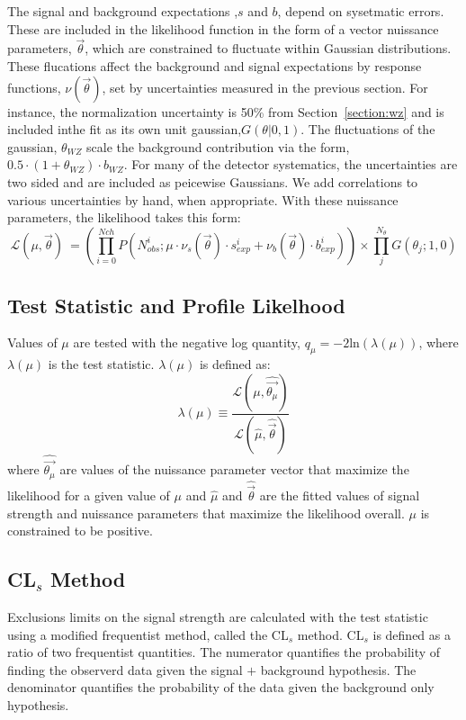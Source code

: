 The signal and background expectations ,$s$ and $b$, depend on sysetmatic errors. These are included in the likelihood function in the form of a vector nuissance parameters, $\vec{\theta}$, which are constrained to fluctuate within Gaussian distributions. These flucations affect the background and signal expectations by response functions, $\nu(\vec{\theta})$, set by uncertainties measured in the previous section. For instance, the \WZ normalization uncertainty is 50\% from Section~\ref{section:wz} and is included inthe fit as its own unit gaussian,$G(\theta|0,1)$. The fluctuations of the gaussian, $\theta_{WZ}$ scale the background contribution via the form, $0.5\cdot(1+\theta_{WZ})\cdot b_{WZ}$. For many of the detector systematics, the uncertainties are two sided and are included as peicewise Gaussians. We add correlations to various uncertainties by hand, when appropriate. With these nuissance parameters, the likelihood takes this form:
\begin{equation}
\mathcal{L}(\mu,\vec{\theta})\ =  \left( \prod_{i=0}^{N{ch}} P(N_{obs}^{i}; \mu \cdot \nu_{s}(\vec{\theta})\cdot s_{exp}^{i} + \nu_{b}(\vec{\theta})\cdot b_{exp}^{i}) \right) \times \prod_{j}^{N_{\theta}}G(\theta_j; 1,0)
\end{equation}


\subsection{Test Statistic and Profile Likelhood}

Values of $\mu$ are tested with the negative log quantity, $q_{\mu}= -2$ln$(\lambda(\mu))$, where $\lambda(\mu)$ is the test statistic.
$\lambda(\mu)$ is defined as:
\begin{equation}
\lambda(\mu) \equiv \frac{\mathcal{L}(\mu,\hat{\vec{\theta_{\mu}}})}{\mathcal{L}(\hat{\mu},\hat{\vec{\theta}})}
\end{equation}
where $\hat{\vec{\theta_{\mu}}}$ are values of the nuissance parameter vector that maximize the likelihood for a given value of $\mu$ and $\hat{\mu}$ and $\hat{\vec{\theta}}$ are the fitted values of signal strength and nuissance parameters that maximize the likelihood overall. $\mu$ is constrained to be positive.  

\subsection{ CL$_{s}$ Method}

Exclusions limits on the signal strength are calculated with the test statistic using a modified frequentist method, called the CL$_{s}$ method\cite{0954-3899-28-10-313}. CL$_{s}$ is defined as a ratio of two frequentist quantities. The numerator quantifies the probability of finding the observerd data given the signal $+$ background hypothesis. The denominator quantifies the probability of the data given the background only hypothesis.

